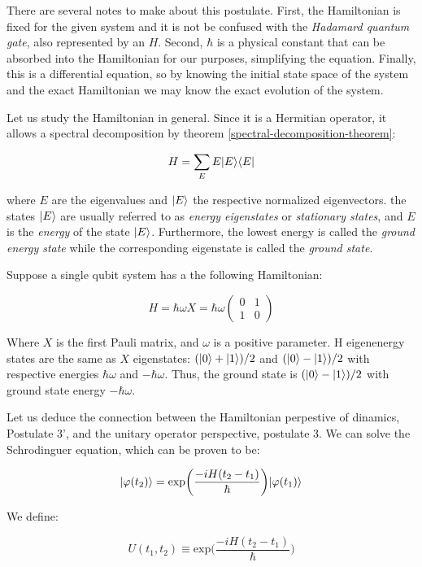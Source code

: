 There are several notes to make about this postulate. First, the Hamiltonian is fixed for the given system and it is not be confused with the \emph{Hadamard quantum gate}, also represented by an $H$. Second, $\hbar$ is a physical constant that can be absorbed into the Hamiltonian for our purposes, simplifying the equation. Finally, this is a differential equation, so by knowing the initial state space of the system and the exact Hamiltonian we may know the exact evolution of the system.

Let us study the Hamiltonian in general. Since it is a Hermitian operator, it allows a spectral decomposition by theorem \ref{spectral-decomposition-theorem}:

$$ H = \sum_E E |E\rangle\langle E| $$

where $E$ are the eigenvalues and $|E\rangle$ the respective normalized eigenvectors. the states $|E\rangle$ are usually referred to as \emph{energy eigenstates} or \emph{stationary states}, and $E$ is the \emph{energy} of the state $|E\rangle$. Furthermore, the lowest energy is called the \emph{ground energy state} while the corresponding eigenstate is called the \emph{ground state}.

\begin{exampleth} Suppose a single qubit system has a the following Hamiltonian:
	
	$$ H = \hbar \omega X = \hbar \omega
	\begin{pmatrix}
		0 & 1 \\
		1 & 0 
	\end{pmatrix}
	$$
	
	Where $X$ is the first Pauli matrix, and $\omega$ is a positive parameter. H eigenenergy states are the same as $X$ eigenstates: $(|0\rangle + |1\rangle)/2$ and $(|0\rangle - |1\rangle)/2$ with respective energies $\hbar\omega$ and $-\hbar\omega$. Thus, the ground state is $(|0\rangle - |1\rangle)/2$ with ground state energy $-\hbar\omega$.
\end{exampleth}

Let us deduce the connection between the Hamiltonian perpestive of dinamics, Postulate 3', and the unitary operator perspective, postulate 3. We can solve the Schrodinguer equation, which can be proven to be:

$$ |\varphi(t_2)\rangle = \text{exp} \bigg(  \frac{-iH(t_2-t_1)}{\hbar} \bigg) |\varphi(t_1)\rangle $$

We define:

$$ U(t_1, t_2) \equiv \text{exp} \bigg(  \frac{-iH(t_2-t_1)}{\hbar} \bigg) $$

